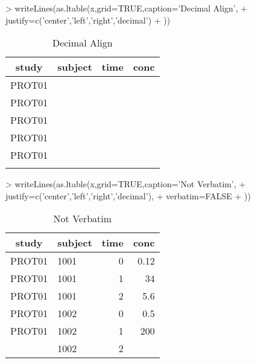 \documentclass[titlepage]{article}
\begin{document}
\begin{Schunk}
\begin{Sinput}
> writeLines(as.ltable(x,grid=TRUE,caption='Decimal Align',
+     justify=c('center','left','right','decimal')
+ ))
\end{Sinput}
\begin{table}[H]
 \caption[Decimal Align]{Decimal Align }
 \begin{center}
  \begin{tabular}{c|l|r|r}
    \hline \hline
   study & subject & time & conc \\ \hline
   PROT01 & \verb#1001# & \verb#0# & \verb#0.12# \\ \hline
   PROT01 & \verb#1001# & \verb#1# & \verb#34   # \\ \hline
   PROT01 & \verb#1001# & \verb#2# & \verb#5.6 # \\ \hline
   PROT01 & \verb#1002# & \verb#0# & \verb#0.5 # \\ \hline
   PROT01 & \verb#1002# & \verb#1# & \verb#200   # \\ \hline
    & \verb#1002# & \verb#2# & \verb## \\ \hline
  \end{tabular}
 \end{center}
\end{table}\end{Schunk}
\begin{Schunk}
\begin{Sinput}
> writeLines(as.ltable(x,grid=TRUE,caption='Not Verbatim',
+     justify=c('center','left','right','decimal'),
+     verbatim=FALSE
+ ))
\end{Sinput}
\begin{table}[H]
 \caption[Not Verbatim]{Not Verbatim }
 \begin{center}
  \begin{tabular}{c|l|r|r}
    \hline \hline
   study & subject & time & conc \\ \hline
   PROT01 & 1001 & 0 & 0.12 \\ \hline
   PROT01 & 1001 & 1 & 34    \\ \hline
   PROT01 & 1001 & 2 & 5.6  \\ \hline
   PROT01 & 1002 & 0 & 0.5  \\ \hline
   PROT01 & 1002 & 1 & 200    \\ \hline
    & 1002 & 2 &  \\ \hline
  \end{tabular}
 \end{center}
\end{table}\end{Schunk}
\end{document}

